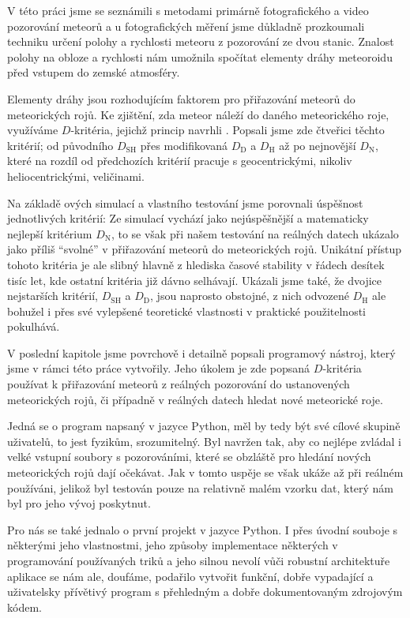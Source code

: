 V této práci jsme se seznámili s metodami primárně fotografického a video pozorování meteorů a u fotografických měření jsme důkladně prozkoumali techniku určení polohy a rychlosti meteoru z pozorování ze dvou stanic. Znalost polohy na obloze a rychlosti nám umožnila spočítat elementy dráhy meteoroidu před vstupem do zemské atmosféry.

\medskip

Elementy dráhy jsou rozhodujícím faktorem pro přiřazování meteorů do meteorických rojů. Ke zjištění, zda meteor náleží do daného meteorického roje, využíváme $D$-kritéria, jejichž princip navrhli \citeauthor{dsh}. Popsali jsme zde čtveřici těchto kritérií; od původního $D_\text{SH}$ přes modifikovaná $D_\text{D}$ a $D_\text{H}$ až po nejnovější $D_\text{N}$, které na rozdíl od předchozích kritérií pracuje s geocentrickými, nikoliv heliocentrickými, veličinami.

Na základě \citeauthor{galligan}ových simulací a vlastního testování jsme porovnali úspěšnost jednotlivých kritérií: Ze simulací vychází jako nejúspěšnější a matematicky nejlepší kritérium $D_\text{N}$, to se však při našem testování na reálných datech ukázalo jako příliš "`svolné"' v přiřazování meteorů do meteorických rojů. Unikátní přístup tohoto kritéria je ale slibný hlavně z hlediska časové stability v řádech desítek tisíc let, kde ostatní kritéria již dávno selhávají. Ukázali jsme také, že dvojice nejstarších kritérií, $D_\text{SH}$ a $D_\text{D}$, jsou naprosto obstojné, z nich odvozené $D_\text{H}$ ale bohužel i přes své vylepšené teoretické vlastnosti v praktické použitelnosti pokulhává.

\medskip

V poslední kapitole jsme povrchově i detailně popsali programový nástroj, který jsme v rámci této práce vytvořily. Jeho úkolem je zde popsaná $D$-kritéria používat k přiřazování meteorů z reálných pozorování do ustanovených meteorických rojů, či případně v reálných datech hledat nové meteorické roje.

Jedná se o program napsaný v jazyce Python, měl by tedy být své cílové skupině uživatelů, to jest fyzikům, srozumitelný. Byl navržen tak, aby co nejlépe zvládal i velké vstupní soubory s pozorováními, které se obzláště pro hledání nových meteorických rojů dají očekávat. Jak v tomto uspěje se však ukáže až při reálném používáni, jelikož byl testován pouze na relativně malém vzorku dat, který nám byl pro jeho vývoj poskytnut.

\smallskip

Pro nás se také jednalo o první projekt v jazyce Python. I přes úvodní souboje s některými jeho vlastnostmi, jeho způsoby implementace některých v programování používaných triků a jeho silnou nevolí vůči robustní architektuře aplikace se nám ale, doufáme, podařilo vytvořit funkční, dobře vypadající a uživatelsky přívětivý program s přehledným a dobře dokumentovaným zdrojovým kódem.
% 
